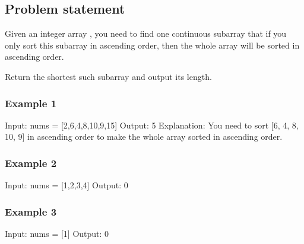\documentclass[letterpaper,12pt,english]{book}
\begin{document}
\subsection{Problem statement\sphinxfootnotemark[109]}
\label{\detokenize{Two_Pointers/08_TP_581_Shortest_Unsorted_Continuous_Subarray:problem-statement}}%
\begin{footnotetext}[109]\sphinxAtStartFootnote
{}
%
\end{footnotetext}\ignorespaces 
\sphinxAtStartPar
Given an integer array , you need to find one continuous subarray that if you only sort this subarray in ascending order, then the whole array will be sorted in ascending order.

\sphinxAtStartPar
Return the shortest such subarray and output its length.


\subsubsection{Example 1}
\label{\detokenize{Two_Pointers/08_TP_581_Shortest_Unsorted_Continuous_Subarray:example-1}}
\begin{sphinxVerbatim}[commandchars=\\\{\}]
Input: nums = [2,6,4,8,10,9,15]
Output: 5
Explanation: You need to sort [6, 4, 8, 10, 9] in ascending order to make the whole array sorted in ascending order.
\end{sphinxVerbatim}


\subsubsection{Example 2}
\label{\detokenize{Two_Pointers/08_TP_581_Shortest_Unsorted_Continuous_Subarray:example-2}}
\begin{sphinxVerbatim}[commandchars=\\\{\}]
Input: nums = [1,2,3,4]
Output: 0
\end{sphinxVerbatim}


\subsubsection{Example 3}
\label{\detokenize{Two_Pointers/08_TP_581_Shortest_Unsorted_Continuous_Subarray:example-3}}
\begin{sphinxVerbatim}[commandchars=\\\{\}]
Input: nums = [1]
Output: 0
\end{sphinxVerbatim}
\end{document}
